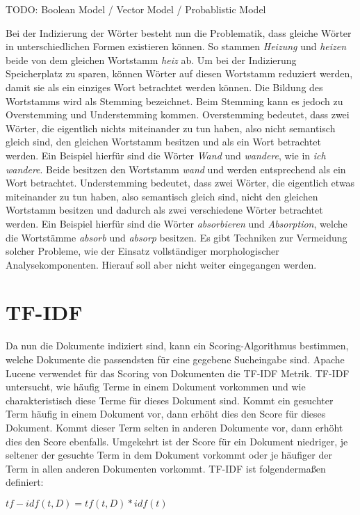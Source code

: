 TODO: Boolean Model / Vector Model / Probablistic Model

Bei der Indizierung der Wörter besteht nun die Problematik, dass gleiche Wörter in unterschiedlichen Formen existieren können.
So stammen \textit{Heizung} und \textit{heizen} beide von dem gleichen Wortstamm \textit{heiz} ab.
Um bei der Indizierung Speicherplatz zu sparen, können Wörter auf diesen Wortstamm reduziert werden, damit sie als ein einziges Wort betrachtet werden können.
Die Bildung des Wortstamms wird als Stemming bezeichnet.
Beim Stemming kann es jedoch zu Overstemming und Understemming kommen.
Overstemming bedeutet, dass zwei Wörter, die eigentlich nichts miteinander zu tun haben, also nicht semantisch gleich sind, den gleichen Wortstamm besitzen und als ein Wort betrachtet werden.
Ein Beispiel hierfür sind die Wörter \textit{Wand} und \textit{wandere}, wie in \textit{ich wandere}.
Beide besitzen den Wortstamm \textit{wand} und werden entsprechend als ein Wort betrachtet.
Understemming bedeutet, dass zwei Wörter, die eigentlich etwas miteinander zu tun haben, also semantisch gleich sind, nicht den gleichen Wortstamm besitzen und dadurch als zwei verschiedene Wörter betrachtet werden.
Ein Beispiel hierfür sind die Wörter \textit{absorbieren} und \textit{Absorption}, welche die Wortstämme \textit{absorb} und \textit{absorp} besitzen.
Es gibt Techniken zur Vermeidung solcher Probleme, wie der Einsatz vollständiger morphologischer Analysekomponenten.
Hierauf soll aber nicht weiter eingegangen werden.\\

\section{TF-IDF}
Da nun die Dokumente indiziert sind, kann ein Scoring-Algorithmus bestimmen, welche Dokumente die passendsten für eine gegebene Sucheingabe sind.
Apache Lucene verwendet für das Scoring von Dokumenten die TF-IDF Metrik.
TF-IDF untersucht, wie häufig Terme in einem Dokument vorkommen und wie charakteristisch diese Terme für dieses Dokument sind.
Kommt ein gesuchter Term häufig in einem Dokument vor, dann erhöht dies den Score für dieses Dokument.
Kommt dieser Term selten in anderen Dokumente vor, dann erhöht dies den Score ebenfalls.
Umgekehrt ist der Score für ein Dokument niedriger, je seltener der gesuchte Term in dem Dokument vorkommt oder je häufiger der Term in allen anderen Dokumenten vorkommt.
TF-IDF ist folgendermaßen definiert:

\(tf-idf(t,D)=tf(t,D)*idf(t)\)

